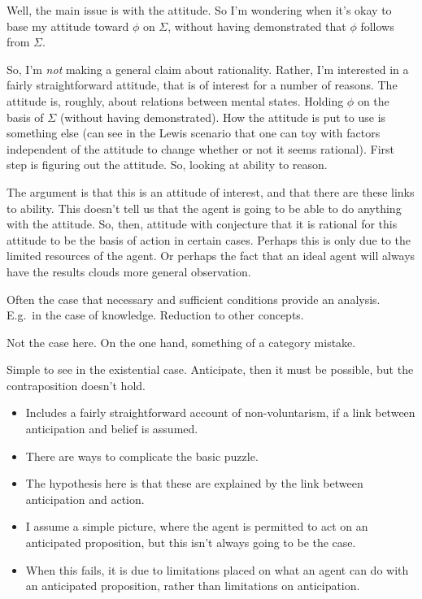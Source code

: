 \documentclass[10pt]{article}
\begin{document}
{{    Well, the main issue is with the attitude.
    So I'm wondering when it's okay to base my attitude toward \(\phi\) on \(\Sigma\), without having demonstrated that \(\phi\) follows from \(\Sigma\).

    So, I'm \emph{not} making a general claim about rationality.
    Rather, I'm interested in a fairly straightforward attitude, that is of interest for a number of reasons.
    The attitude is, roughly, about relations between mental states.
    Holding \(\phi\) on the basis of \(\Sigma\) (without having demonstrated).
    How the attitude is put to use is something else (can see in the Lewis scenario that one can toy with factors independent of the attitude to change whether or not it seems rational).
    First step is figuring out the attitude.
    So, looking at ability to reason.

    The argument is that this is an attitude of interest, and that there are these links to ability.
    This doesn't tell us that the agent is going to be able to do anything with the attitude.
    So, then, attitude with conjecture that it is rational for this attitude to be the basis of action in certain cases.
    Perhaps this is only due to the limited resources of the agent.
    Or perhaps the fact that an ideal agent will always have the results clouds more general observation.
    
  }


  
  Often the case that necessary and sufficient conditions provide an analysis.
  E.g.\ in the case of knowledge.
  Reduction to other concepts.

  Not the case here.
  On the one hand, something of a category mistake.
  

  Simple to see in the existential case.
  Anticipate, then it must be possible, but the contraposition doesn't hold.
}


\begin{itemize}
\item Includes a fairly straightforward account of non-voluntarism, if a link between anticipation and belief is assumed.
\end{itemize}


\begin{itemize}
\item There are ways to complicate the basic puzzle.
\item The hypothesis here is that these are explained by the link between anticipation and action.
\item I assume a simple picture, where the agent is permitted to act on an anticipated proposition, but this isn't always going to be the case.
\item When this fails, it is due to limitations placed on what an agent can do with an anticipated proposition, rather than limitations on anticipation.
\end{itemize}
\end{document}
